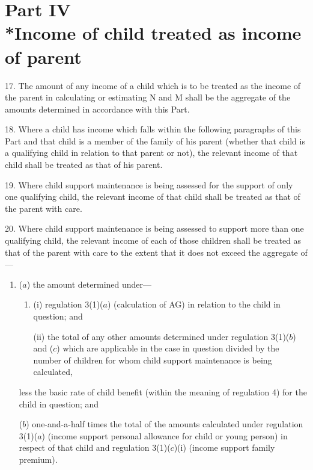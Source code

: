 \documentclass[a4paper]{article}
\newcommand{\parthead}{}
\begin{document}
\section[Part IV --- Income of child treated as income of parent]{Part IV\\*Income of child treated as income of parent}

\renewcommand\parthead{--- Schedule 1 Part IV}

17.  The amount of any income of a child which is to be treated as the income of the parent in calculating or estimating N and M shall be the aggregate of the amounts determined in accordance with this Part.

\medskip

18.  Where a child has income which falls within the following paragraphs of this Part and that child is a member of the family of his parent (whether that child is a qualifying child in relation to that parent or not), the relevant income of that child shall be treated as that of his parent.

\medskip

19.  Where child support maintenance is being assessed for the support of only one qualifying child, the relevant income of that child shall be treated as that of the parent with care.

\medskip

20.  Where child support maintenance is being assessed to support more than one qualifying child, the relevant income of each of those children shall be treated as that of the parent with care to the extent that it does not exceed the aggregate of—
\begin{enumerate}\item[]
($a$) the amount determined under—
\begin{enumerate}\item[]
(i) regulation 3(1)($a$) (calculation of AG) in relation to the child in question; and

(ii) the total of any other amounts determined under regulation 3(1)($b$) 
and ($c$)  %
which are applicable in the case in question divided by the number of children for whom child support maintenance is being calculated,
\end{enumerate}
less the basic rate of child benefit (within the meaning of regulation 4) for the child in question; and

($b$) 
one-and-a-half times  %
the total of the amounts calculated under regulation 3(1)($a$) (income support personal allowance for child or young person) in respect of that child and regulation 
3(1)($c$)(i)  %
(income support family premium).
\end{enumerate}
\end{document}
